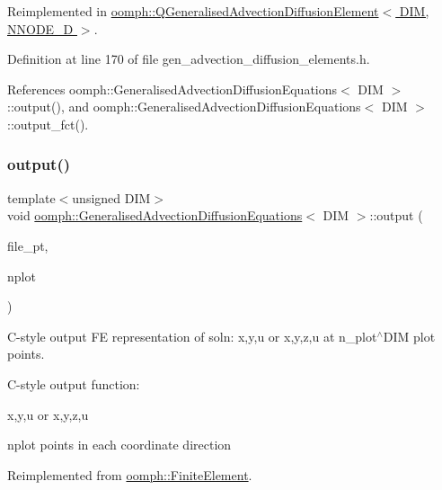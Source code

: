 Reimplemented in \hyperlink{classoomph_1_1QGeneralisedAdvectionDiffusionElement_a291f773ee4bab3e9323b64c27448e89d}{oomph\+::\+Q\+Generalised\+Advection\+Diffusion\+Element$<$ D\+I\+M, N\+N\+O\+D\+E\+\_\+D $>$}.



Definition at line 170 of file gen\+\_\+advection\+\_\+diffusion\+\_\+elements.\+h.



References oomph\+::\+Generalised\+Advection\+Diffusion\+Equations$<$ D\+I\+M $>$\+::output(), and oomph\+::\+Generalised\+Advection\+Diffusion\+Equations$<$ D\+I\+M $>$\+::output\+\_\+fct().

\mbox{\label{classoomph_1_1GeneralisedAdvectionDiffusionEquations_afcc8b4ee77728a11e26f8cd512874832}} 
\subsubsection{\texorpdfstring{output()}{output()}\hspace{0.1cm}{\footnotesize\ttfamily [4/4]}}
{\footnotesize\ttfamily template$<$unsigned D\+IM$>$ \\
void \hyperlink{classoomph_1_1GeneralisedAdvectionDiffusionEquations}{oomph\+::\+Generalised\+Advection\+Diffusion\+Equations}$<$ D\+IM $>$\+::output (\begin{DoxyParamCaption}\item[{F\+I\+LE $\ast$}]{file\+\_\+pt,  }\item[{const unsigned \&}]{nplot }\end{DoxyParamCaption})\hspace{0.3cm}{\ttfamily [virtual]}}



C-\/style output FE representation of soln\+: x,y,u or x,y,z,u at n\+\_\+plot$^\wedge$\+D\+IM plot points. 

C-\/style output function\+:

x,y,u or x,y,z,u

nplot points in each coordinate direction 

Reimplemented from \hyperlink{classoomph_1_1FiniteElement_adfaee690bb0608f03320eeb9d110d48c}{oomph\+::\+Finite\+Element}.



